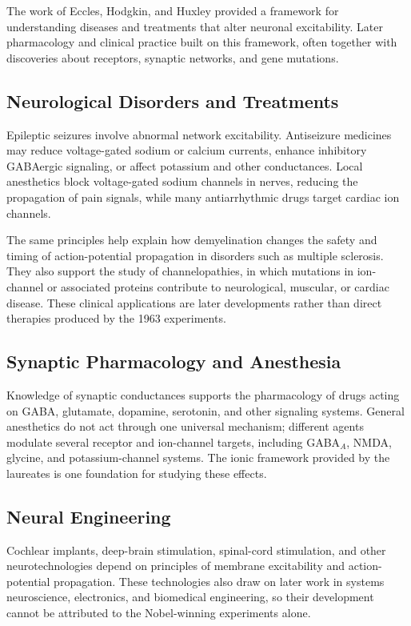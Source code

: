 The work of Eccles, Hodgkin, and Huxley provided a framework for understanding diseases and treatments that alter neuronal excitability. Later pharmacology and clinical practice built on this framework, often together with discoveries about receptors, synaptic networks, and gene mutations.

\subsection{Neurological Disorders and Treatments}

Epileptic seizures involve abnormal network excitability. Antiseizure medicines may reduce voltage-gated sodium or calcium currents, enhance inhibitory GABAergic signaling, or affect potassium and other conductances. Local anesthetics block voltage-gated sodium channels in nerves, reducing the propagation of pain signals, while many antiarrhythmic drugs target cardiac ion channels.

The same principles help explain how demyelination changes the safety and timing of action-potential propagation in disorders such as multiple sclerosis. They also support the study of channelopathies, in which mutations in ion-channel or associated proteins contribute to neurological, muscular, or cardiac disease. These clinical applications are later developments rather than direct therapies produced by the 1963 experiments.

\subsection{Synaptic Pharmacology and Anesthesia}

Knowledge of synaptic conductances supports the pharmacology of drugs acting on GABA, glutamate, dopamine, serotonin, and other signaling systems. General anesthetics do not act through one universal mechanism; different agents modulate several receptor and ion-channel targets, including GABA$_A$, NMDA, glycine, and potassium-channel systems. The ionic framework provided by the laureates is one foundation for studying these effects.

\subsection{Neural Engineering}

Cochlear implants, deep-brain stimulation, spinal-cord stimulation, and other neurotechnologies depend on principles of membrane excitability and action-potential propagation. These technologies also draw on later work in systems neuroscience, electronics, and biomedical engineering, so their development cannot be attributed to the Nobel-winning experiments alone.


